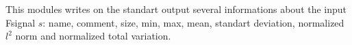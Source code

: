 This modules writes on the standart output several informations about
the input Fsignal $s$: name, comment, size, min, max, mean, standart
deviation, normalized $l^2$ norm and normalized total variation.
